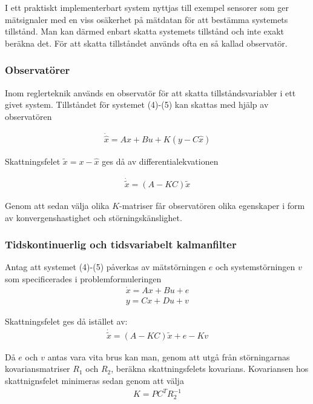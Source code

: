 \documentclass[a4paper,12pt,fleqn]{article}
\begin{document}
I ett praktiskt implementerbart system nyttjas till exempel sensorer som ger mätsignaler med en viss osäkerhet på mätdatan för att bestämma systemets tillstånd. Man kan därmed enbart skatta systemets tillstånd och inte exakt beräkna det. För att skatta tillståndet används ofta en så kallad observatör.

\subsubsection{Observatörer}

Inom reglerteknik används en observatör för att skatta tillståndsvariabler i ett givet system. Tillståndet för systemet (4)-(5) kan skattas med hjälp av observatören

\begin{gather}
\dot{\hat{x}} = Ax + Bu + K(y - C\hat{x})
\label{equ:observer}
\end{gather}

Skattningsfelet $\tilde{x}= x - \hat{x}$ ges då av differentialekvationen

\begin{gather}
\dot{\tilde{x}} = (A - KC)\tilde{x}
\label{equ:observerError}
\end{gather}

Genom att sedan välja olika $K$-matriser får observatören olika egenskaper i form av konvergenshastighet och störningskänslighet. 

\subsubsection{Tidskontinuerlig och tidsvariabelt kalmanfilter}

Antag att systemet (4)-(5) påverkas av mätstörningen $e$ och systemstörningen $v$ som specificerades i problemformuleringen
\begin{gather}
\dot{x}=Ax+Bu+e \\
y=Cx+Du+v
\end{gather}

Skattningsfelet ges då istället av: 
\begin{gather}
\dot{\tilde{x}} = (A - KC)\tilde{x} + e - Kv
\end{gather}

Då $e$ och $v$ antas vara vita brus kan man, genom att utgå från störningarnas kovariansmatriser $R_1$ och $R_2$, beräkna skattningsfelets kovarians. Kovariansen hos skattnignsfelet minimeras sedan genom att välja 
\begin{gather}
K = PC^{T}R_{2}^{-1}
\end{gather}
\end{document}
